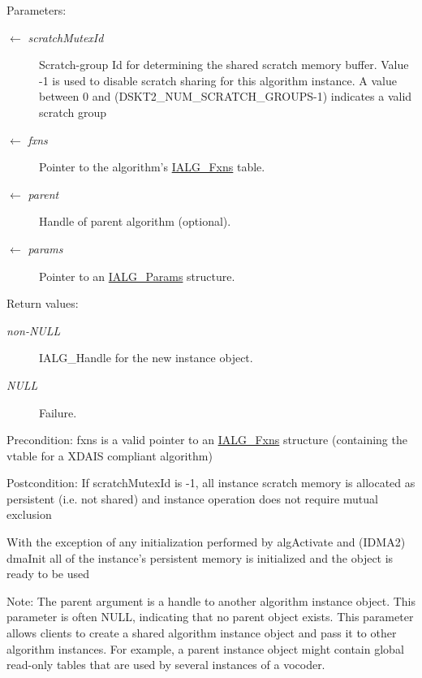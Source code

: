 \begin{Desc}
\item[Parameters:]
\begin{description}
\item[\mbox{$\leftarrow$} {\em scratch\-Mutex\-Id}]Scratch-group Id for determining the shared scratch memory buffer. Value -1 is used to disable scratch sharing for this algorithm instance. A value between 0 and (DSKT2\_\-NUM\_\-SCRATCH\_\-GROUPS-1) indicates a valid scratch group \item[\mbox{$\leftarrow$} {\em fxns}]Pointer to the algorithm's \hyperlink{struct_i_a_l_g___fxns}{IALG\_\-Fxns} table. \item[\mbox{$\leftarrow$} {\em parent}]Handle of parent algorithm (optional). \item[\mbox{$\leftarrow$} {\em params}]Pointer to an \hyperlink{struct_i_a_l_g___params}{IALG\_\-Params} structure.\end{description}
\end{Desc}
\begin{Desc}
\item[Return values:]
\begin{description}
\item[{\em non-NULL}]IALG\_\-Handle for the new instance object. \item[{\em NULL}]Failure.\end{description}
\end{Desc}
\begin{Desc}
\item[Precondition:]fxns is a valid pointer to an \hyperlink{struct_i_a_l_g___fxns}{IALG\_\-Fxns} structure (containing the vtable for a XDAIS compliant algorithm)\end{Desc}
\begin{Desc}
\item[Postcondition:]If scratch\-Mutex\-Id is -1, all instance scratch memory is allocated as persistent (i.e. not shared) and instance operation does not require mutual exclusion

With the exception of any initialization performed by alg\-Activate and (IDMA2) dma\-Init all of the instance's persistent memory is initialized and the object is ready to be used\end{Desc}
\begin{Desc}
\item[Note:]The parent argument is a handle to another algorithm instance object. This parameter is often NULL, indicating that no parent object exists. This parameter allows clients to create a shared algorithm instance object and pass it to other algorithm instances. For example, a parent instance object might contain global read-only tables that are used by several instances of a vocoder.\end{Desc}
